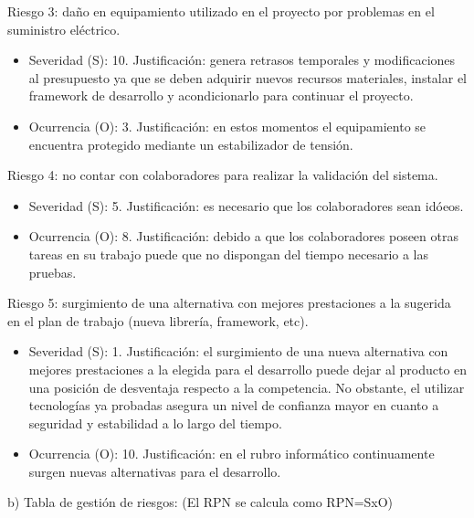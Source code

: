 \documentclass[
11pt, %
]{charter}
\begin{document}
Riesgo 3: daño en equipamiento utilizado en el proyecto por problemas en el suministro eléctrico.
\begin{itemize}
	\item Severidad (S): 10.\newline 
	Justificación: genera retrasos temporales y modificaciones al presupuesto ya que se deben adquirir nuevos recursos materiales, instalar el framework de desarrollo y acondicionarlo para continuar el proyecto.
	\item Ocurrencia (O): 3.\newline 
	Justificación: en estos momentos el equipamiento se encuentra protegido mediante un estabilizador de tensión.
\end{itemize}	
Riesgo 4: no contar con colaboradores para realizar la validación del sistema.
\begin{itemize}
	\item Severidad (S): 5.\newline 
	Justificación: es necesario que los colaboradores sean idóeos.
	\item Ocurrencia (O): 8.\newline 
	Justificación: debido a que los colaboradores poseen otras tareas en su trabajo puede que no dispongan del tiempo necesario a las pruebas.
\end{itemize}
Riesgo 5: surgimiento de una alternativa con mejores prestaciones a la sugerida en el plan de trabajo (nueva librería, framework, etc).
\begin{itemize}
	\item Severidad (S): 1.\newline 
	Justificación: el surgimiento de una nueva alternativa con mejores prestaciones a la elegida para el desarrollo puede dejar al producto en una posición de desventaja respecto a la competencia. No obstante, el utilizar tecnologías ya probadas asegura un nivel de confianza mayor en cuanto a seguridad y estabilidad a lo largo del tiempo.
	\item Ocurrencia (O): 10.\newline 
	Justificación: en el rubro informático continuamente surgen nuevas alternativas para el desarrollo. 	
		 
	
\end{itemize}

\newpage
b) Tabla de gestión de riesgos:      (El RPN se calcula como RPN=SxO)
\end{document}
